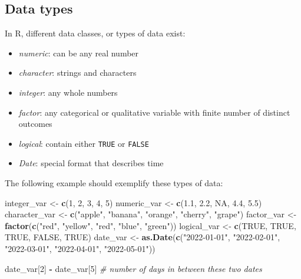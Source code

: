 \documentclass[
  12pt,
  oneside]{book}
\newenvironment{Shaded}{\begin{snugshade}}{\end{snugshade}}
\newcommand{\CommentTok}[1]{\textcolor[rgb]{0.56,0.35,0.01}{\textit{#1}}}
\newcommand{\ConstantTok}[1]{\textcolor[rgb]{0.56,0.35,0.01}{#1}}
\newcommand{\DecValTok}[1]{\textcolor[rgb]{0.00,0.00,0.81}{#1}}
\newcommand{\FloatTok}[1]{\textcolor[rgb]{0.00,0.00,0.81}{#1}}
\newcommand{\FunctionTok}[1]{\textcolor[rgb]{0.13,0.29,0.53}{\textbf{#1}}}
\newcommand{\NormalTok}[1]{#1}
\newcommand{\OtherTok}[1]{\textcolor[rgb]{0.56,0.35,0.01}{#1}}
\newcommand{\SpecialCharTok}[1]{\textcolor[rgb]{0.81,0.36,0.00}{\textbf{#1}}}
\newcommand{\StringTok}[1]{\textcolor[rgb]{0.31,0.60,0.02}{#1}}
\providecommand{\tightlist}{%
  \setlength{\itemsep}{0pt}\setlength{\parskip}{0pt}}
\theoremstyle{definition}
\theoremstyle{definition}
\theoremstyle{definition}
\theoremstyle{definition}
\theoremstyle{remark}
\begin{document}
\hypertarget{data-types}{%
\subsection{Data types}\label{data-types}}

In R, different data classes, or types of data exist:

\begin{itemize}
\tightlist
\item
  \emph{numeric}: can be any real number
\item
  \emph{character}: strings and characters
\item
  \emph{integer}: any whole numbers
\item
  \emph{factor}: any categorical or qualitative variable with finite number of distinct outcomes
\item
  \emph{logical}: contain either \texttt{TRUE} or \texttt{FALSE}
\item
  \emph{Date}: special format that describes time
\end{itemize}

The following example should exemplify these types of data:

\begin{Shaded}
\begin{Highlighting}[]
\NormalTok{integer\_var }\OtherTok{\textless{}{-}} \FunctionTok{c}\NormalTok{(}\DecValTok{1}\NormalTok{, }\DecValTok{2}\NormalTok{, }\DecValTok{3}\NormalTok{, }\DecValTok{4}\NormalTok{, }\DecValTok{5}\NormalTok{)}
\NormalTok{numeric\_var }\OtherTok{\textless{}{-}} \FunctionTok{c}\NormalTok{(}\FloatTok{1.1}\NormalTok{, }\FloatTok{2.2}\NormalTok{, }\ConstantTok{NA}\NormalTok{, }\FloatTok{4.4}\NormalTok{, }\FloatTok{5.5}\NormalTok{)}
\NormalTok{character\_var }\OtherTok{\textless{}{-}} \FunctionTok{c}\NormalTok{(}\StringTok{"apple"}\NormalTok{, }\StringTok{"banana"}\NormalTok{, }\StringTok{"orange"}\NormalTok{, }\StringTok{"cherry"}\NormalTok{, }\StringTok{"grape"}\NormalTok{)}
\NormalTok{factor\_var }\OtherTok{\textless{}{-}} \FunctionTok{factor}\NormalTok{(}\FunctionTok{c}\NormalTok{(}\StringTok{"red"}\NormalTok{, }\StringTok{"yellow"}\NormalTok{, }\StringTok{"red"}\NormalTok{, }\StringTok{"blue"}\NormalTok{, }\StringTok{"green"}\NormalTok{))}
\NormalTok{logical\_var }\OtherTok{\textless{}{-}} \FunctionTok{c}\NormalTok{(}\ConstantTok{TRUE}\NormalTok{, }\ConstantTok{TRUE}\NormalTok{, }\ConstantTok{TRUE}\NormalTok{, }\ConstantTok{FALSE}\NormalTok{, }\ConstantTok{TRUE}\NormalTok{)}
\NormalTok{date\_var }\OtherTok{\textless{}{-}} \FunctionTok{as.Date}\NormalTok{(}\FunctionTok{c}\NormalTok{(}\StringTok{"2022{-}01{-}01"}\NormalTok{, }\StringTok{"2022{-}02{-}01"}\NormalTok{, }\StringTok{"2022{-}03{-}01"}\NormalTok{, }\StringTok{"2022{-}04{-}01"}\NormalTok{, }\StringTok{"2022{-}05{-}01"}\NormalTok{))}

\NormalTok{date\_var[}\DecValTok{2}\NormalTok{] }\SpecialCharTok{{-}}\NormalTok{ date\_var[}\DecValTok{5}\NormalTok{] }\CommentTok{\# number of days in between these two dates}
\end{Highlighting}
\end{Shaded}
\end{document}
